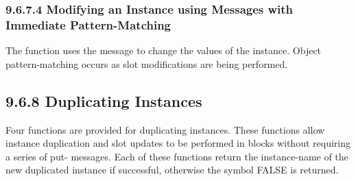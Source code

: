 \documentclass[letterpaper,10pt,english]{sphinxmanual}
\begin{document}
\begin{sphinxVerbatim}[commandchars=\\\{\}]
     
      
  
     
  
\end{sphinxVerbatim}


\subsubsection{9.6.7.4 Modifying an Instance using Messages with Immediate Pattern-Matching}
\label{\detokenize{cool:modifying-an-instance-using-messages-with-immediate-pattern-matching}}
The  function uses the
 message to change the values of the instance. Object
pattern-matching occurs as slot modifications are being performed.


\begin{sphinxVerbatim}[commandchars=\\\{\}]
  
\end{sphinxVerbatim}


\subsection{9.6.8 Duplicating Instances}
\label{\detokenize{cool:duplicating-instances}}
Four functions are provided for duplicating instances. These functions
allow instance duplication and slot updates to be performed in blocks
without requiring a series of put- messages. Each of these functions
return the instance-name of the new duplicated instance if successful,
otherwise the symbol FALSE is returned.
\end{document}
